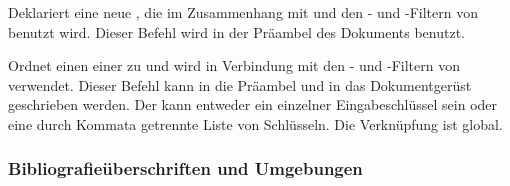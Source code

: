 \documentclass{ltxdockit}[2011/03/25]
\begin{document}
\begin{ltxsyntax}


Deklariert eine neue , die im Zusammenhang mit 
und den - und -Filtern von 
benutzt wird. Dieser Befehl wird in der Präambel des Dokuments benutzt. 
  

Ordnet einen  einer  zu und wird in Verbindung mit den
- und -Filtern von 
verwendet. Dieser Befehl kann in die Präambel und in das Dokumentgerüst
geschrieben werden. Der  kann entweder ein einzelner
Eingabeschlüssel sein oder eine durch Kommata getrennte Liste von
Schlüsseln. Die Verknüpfung ist global.

\end{ltxsyntax}

\subsubsection{Bibliografieüberschriften und Umgebungen} \label{use:bib:hdg}
\end{document}
